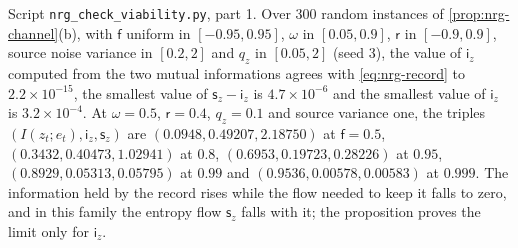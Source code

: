 \begin{numcheck}\label{chk:nrg-record}
Script \texttt{nrg\_\allowbreak check\_\allowbreak viability.py}, part 1. Over $300$ random instances of \cref{prop:nrg-channel}(b), with $\mathsf f$ uniform in $[-0.95,0.95]$, $\omega$ in $[0.05,0.9]$, $\mathsf r$ in $[-0.9,0.9]$, source noise variance in $[0.2,2]$ and $q_z$ in $[0.05,2]$ (seed 3), the value of $\mathsf i_z$ computed from the two mutual informations agrees with \cref{eq:nrg-record} to $2.2\times10^{-15}$, the smallest value of $\mathsf s_z-\mathsf i_z$ is $4.7\times10^{-6}$ and the smallest value of $\mathsf i_z$ is $3.2\times10^{-4}$. At $\omega=0.5$, $\mathsf r=0.4$, $q_z=0.1$ and source variance one, the triples $(I(z_t;e_t),\mathsf i_z,\mathsf s_z)$ are $(0.0948,0.49207,2.18750)$ at $\mathsf f=0.5$, $(0.3432,0.40473,1.02941)$ at $0.8$, $(0.6953,0.19723,0.28226)$ at $0.95$, $(0.8929,0.05313,0.05795)$ at $0.99$ and $(0.9536,0.00578,0.00583)$ at $0.999$. The information held by the record rises while the flow needed to keep it falls to zero, and in this family the entropy flow $\mathsf s_z$ falls with it; the proposition proves the limit only for $\mathsf i_z$.
\end{numcheck}

